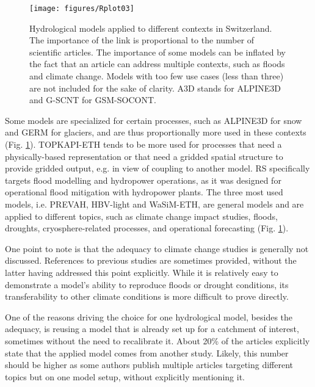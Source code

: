 \documentclass[10pt,a4paper]{article}
\begin{document}
\begin{figure}[htb]
	\begin{center}
		\texttt{[image: figures/Rplot03]}
		\caption{{Hydrological models applied to different contexts in Switzerland. The
				importance of the link is proportional to the number of scientific
				articles. The importance of some models can be inflated by the fact that
				an article can address multiple contexts, such as floods and climate
				change. Models with too few use cases (less than three) are not included
				for the sake of clarity. A3D stands for ALPINE3D and G-SCNT for
				GSM-SOCONT.
				{\label{fig:applications}}
		}}
	\end{center}
\end{figure}

Some models are specialized for certain processes, such as ALPINE3D for
snow and GERM for glaciers, and are thus proportionally more used in
these contexts (Fig. \ref{fig:applications}). TOPKAPI-ETH tends
to be more used for processes that need a physically-based
representation or that need a gridded spatial structure to provide
gridded output, e.g. in view of coupling to another model. RS
specifically targets flood modelling and hydropower operations, as it
was designed for operational flood mitigation with hydropower plants.
The three most used models, i.e. PREVAH, HBV-light and WaSiM-ETH, are
general models and are applied to different topics, such as climate
change impact studies, floods, droughts, cryosphere-related processes,
and operational forecasting (Fig. \ref{fig:applications}).

One point to note is that the adequacy to climate change studies is
generally not discussed. References to previous studies are sometimes
provided, without the latter having addressed this point explicitly.
While it is relatively easy to demonstrate a model's ability to
reproduce floods or drought conditions, its transferability to other
climate conditions is more difficult to prove directly.

One of the reasons driving the choice for one hydrological model,
besides the adequacy, is reusing a model that is already set up for a
catchment of interest, sometimes without the need to recalibrate it.
About 20\% of the articles explicitly state that the applied model comes
from another study. Likely, this number should be higher as some authors
publish multiple articles targeting different topics but on one model
setup, without explicitly mentioning it.
\end{document}
